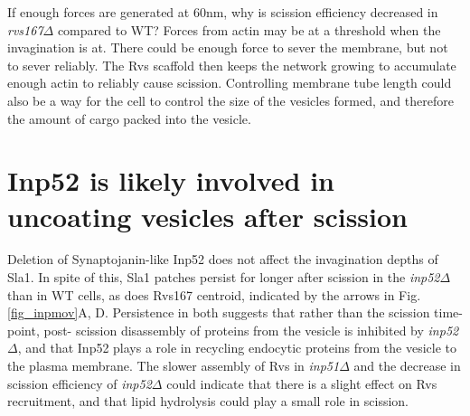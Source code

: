 	\vspace{5mm}
If enough forces are generated at 60nm, why is scission efficiency decreased in \textit{rvs167$\Delta$} compared to WT? 
Forces from actin may be at a threshold when the invagination is at. There could be enough force to sever the membrane, but not to sever reliably. The Rvs scaffold then keeps the network growing to accumulate enough actin to reliably cause scission. Controlling membrane tube length could also be a way for the cell to control the size of the vesicles formed, and therefore the amount of cargo packed into the vesicle. 





\section{Inp52 is likely involved in uncoating vesicles after scission}
Deletion of Synaptojanin-like Inp52 does not affect the invagination depths of Sla1. In spite of this, Sla1 patches persist for longer after scission in the \textit{inp52$\Delta$} than in WT cells, as does Rvs167 centroid, indicated by the arrows in Fig.\ref{fig_inpmov}A, D. Persistence in both suggests that rather than the scission time-point, post- scission disassembly of proteins from the vesicle is inhibited by \textit{inp52$\Delta$}, and that Inp52 plays a role in recycling endocytic proteins from the vesicle to the plasma membrane. The slower assembly of Rvs in \textit{inp51$\Delta$}  and the decrease in scission efficiency of \textit{inp52$\Delta$} could indicate that there is a slight effect on Rvs recruitment, and that lipid hydrolysis could play a small role in scission. 



